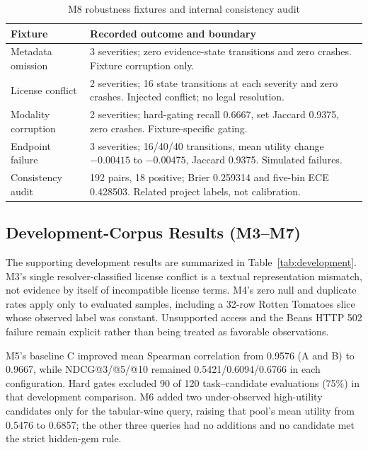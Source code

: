 \documentclass[conference]{IEEEtran}
\begin{document}
\begin{table}[t]
\caption{M8 robustness fixtures and internal consistency audit}
\label{tab:robustness}
\centering
\footnotesize
\begin{tabularx}{\columnwidth}{p{0.92in}X}
\toprule
Fixture & Recorded outcome and boundary\\
\midrule
Metadata omission & 3 severities; zero evidence-state transitions and zero crashes. Fixture corruption only.\\
License conflict & 2 severities; 16 state transitions at each severity and zero crashes. Injected conflict; no legal resolution.\\
Modality corruption & 2 severities; hard-gating recall 0.6667, set Jaccard 0.9375, zero crashes. Fixture-specific gating.\\
Endpoint failure & 3 severities; 16/40/40 transitions, mean utility change $-0.00415$ to $-0.00475$, Jaccard 0.9375. Simulated failures.\\
Consistency audit & 192 pairs, 18 positive; Brier 0.259314 and five-bin ECE 0.428503. Related project labels, not calibration.\\
\bottomrule
\end{tabularx}
\end{table}
\subsection{Development-Corpus Results (M3--M7)}
The supporting development results are summarized in Table~\ref{tab:development}. M3's single resolver-classified license conflict is a textual representation mismatch, not evidence by itself of incompatible license terms. M4's zero null and duplicate rates apply only to evaluated samples, including a 32-row Rotten Tomatoes slice whose observed label was constant. Unsupported access and the Beans HTTP 502 failure remain explicit rather than being treated as favorable observations.

M5's baseline C improved mean Spearman correlation from 0.9576 (A and B) to 0.9667, while NDCG@3/@5/@10 remained 0.5421/0.6094/0.6766 in each configuration. Hard gates excluded 90 of 120 task--candidate evaluations (75\%) in that development comparison. M6 added two under-observed high-utility candidates only for the tabular-wine query, raising that pool's mean utility from 0.5476 to 0.6857; the other three queries had no additions and no candidate met the strict hidden-gem rule.
\end{document}
